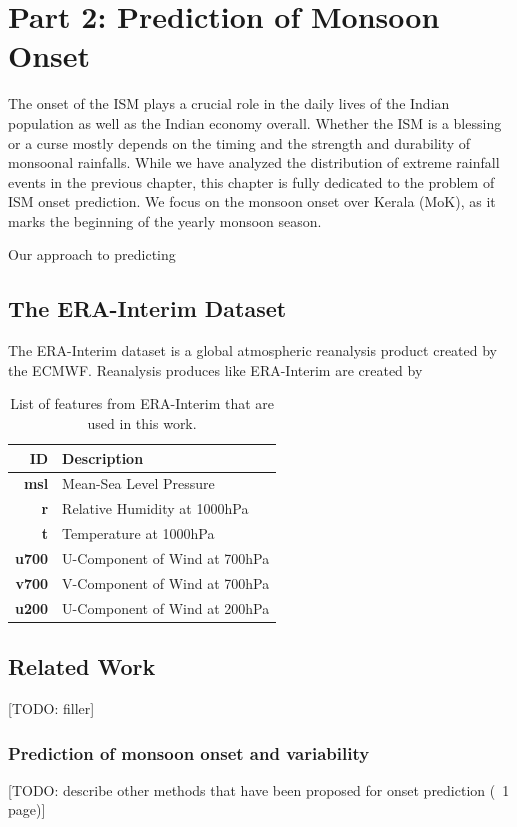 \chapter{Part 2: Prediction of Monsoon Onset}
\label{c:part2}
The onset of the ISM plays a crucial role in the daily lives of the Indian population as well as the Indian economy overall. Whether the ISM is a blessing or a curse mostly depends on the timing and the strength and durability of monsoonal rainfalls. While we have analyzed the distribution of extreme rainfall events in the previous chapter, this chapter is fully dedicated to the problem of ISM onset prediction. We focus on the monsoon onset over Kerala (MoK), as it marks the beginning of the yearly monsoon season.

Our approach to predicting



\section{The ERA-Interim Dataset}
\label{st:era_interim}
The ERA-Interim dataset is a global atmospheric reanalysis product created by the ECMWF. Reanalysis produces like ERA-Interim are created by

\begin{table}[h]
  \centering
  \begin{tabular}{rl}
    \toprule
    \textbf{ID} & \textbf{Description} \\
    \midrule
    \textbf{msl} & Mean-Sea Level Pressure \\
    \textbf{r} & Relative Humidity at 1000hPa \\
    \textbf{t} & Temperature at 1000hPa \\
    \textbf{u700} & U-Component of Wind at 700hPa \\
    \textbf{v700} & V-Component of Wind at 700hPa \\
    \textbf{u200} & U-Component of Wind at 200hPa \\
    \bottomrule
  \end{tabular}
  \caption{List of features from ERA-Interim that are used in this work.}
  \label{tab:era_features}
\end{table}

\section{Related Work}
[TODO: filler]


\subsection{Prediction of monsoon onset and variability}
\label{sst:related_prediction}
[TODO:  describe other methods that have been proposed for onset prediction (~1 page)]

